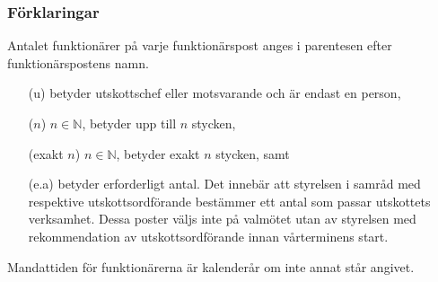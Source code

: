 \documentclass[10pt]{article}
\begin{document}
\subsubsection{Förklaringar}
Antalet funktionärer på varje funktionärspost anges i parentesen efter funktionärspostens namn.
\begin{itemize}
    \item[(u)] betyder utskottschef eller motsvarande och är endast en person,
    \item[($n$)] $n \in \mathbb{N}$, betyder upp till $n$ stycken,
    \item[(exakt $n$)] $n \in \mathbb{N}$, betyder exakt $n$ stycken, samt
    \item[(e.a)] betyder erforderligt antal. Det innebär att styrelsen i samråd med respektive utskottsordförande bestämmer ett antal som passar utskottets verksamhet. Dessa poster väljs inte på valmötet utan av styrelsen med rekommendation av utskottsordförande innan vårterminens start.
\end{itemize}
Mandattiden för funktionärerna är kalenderår om inte annat står angivet.
\end{document}
